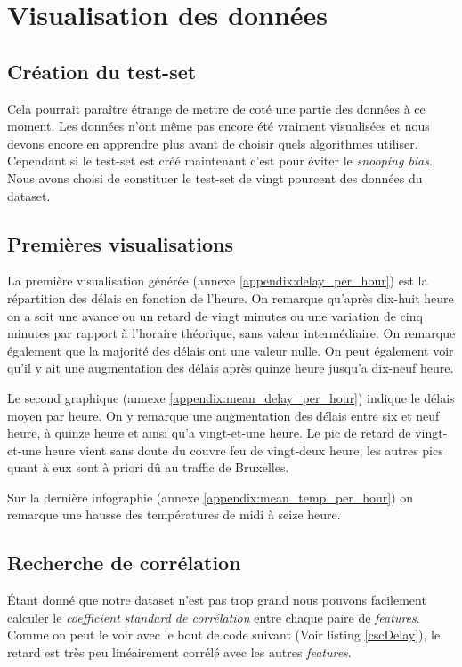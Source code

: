 \section{Visualisation des données}
\subsection{Création du test-set}
Cela pourrait paraître étrange de mettre de coté une partie des données à ce moment. Les données n'ont même pas encore été vraiment visualisées et nous devons encore en apprendre plus avant de choisir quels algorithmes utiliser. Cependant si le test-set est créé maintenant c'est pour éviter le \textit{snooping bias}. Nous avons choisi de constituer le test-set de vingt pourcent des données du dataset.

\subsection{Premières visualisations}
La première visualisation générée (annexe \ref{appendix:delay_per_hour}) est la répartition des délais en fonction de l'heure. On remarque qu'après dix-huit heure on a soit une avance ou un retard de vingt minutes ou une variation de cinq minutes par rapport à l'horaire théorique, sans valeur intermédiaire. On remarque également que la majorité des délais ont une valeur nulle. On peut également voir qu'il y ait une augmentation des délais après quinze heure jusqu'a dix-neuf heure.

Le second graphique (annexe \ref{appendix:mean_delay_per_hour}) indique le délais moyen par heure. On y remarque une augmentation des délais entre six et neuf heure, à quinze heure et ainsi qu'a vingt-et-une heure. Le pic de retard de vingt-et-une heure vient sans doute du couvre feu de vingt-deux heure, les autres pics quant à eux sont à priori dû au traffic de Bruxelles.

Sur la dernière infographie (annexe \ref{appendix:mean_temp_per_hour}) on remarque une hausse des températures de midi à seize heure.

\subsection{Recherche de corrélation}
Étant donné que notre dataset n'est pas trop grand nous pouvons facilement calculer le \textit{coefficient standard de corrélation} entre chaque paire de \textit{features}. Comme on peut le voir avec le bout de code suivant (Voir listing \ref{cscDelay}), le retard est très peu linéairement corrélé avec les autres \textit{features}.

